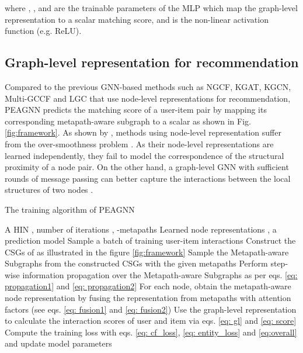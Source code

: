 \documentclass[runningheads, envcountsame, a4paper]{llncs}
\begin{document}
where , ,  and  are the trainable parameters of the MLP which map the graph-level representation  to a scalar matching score, and  is the non-linear activation function (e.g. ReLU).


\subsection{Graph-level representation for recommendation}
Compared to the previous GNN-based methods such as NGCF, KGAT, KGCN, Multi-GCCF and LGC that use node-level representations for recommendation, PEAGNN predicts the matching score of a user-item pair by mapping its corresponding metapath-aware subgraph to a scalar as shown in Fig. \ref{fig:framework}. 
As shown by \cite{zhang2019inductive}, methods using node-level representation suffer from the over-smoothness problem \cite{li2018deeper}\cite{kipf2016semi}.
As their node-level representations are learned independently, 
they fail to model the correspondence of the structural proximity of a node pair. 
On the other hand, a graph-level GNN with sufficient rounds of message passing can better capture the interactions between the local structures of two nodes \cite{xu2018powerful}.

\begin{algorithm}[tb]
   \caption{The training algorithm of PEAGNN}
   \label{alg:peagat}
\begin{algorithmic}[1]
    A HIN , 
number of iterations , -metapaths
    Learned node representations , a prediction  model 
        \STATE Sample a batch  of training user-item interactions
        \STATE Construct the CSGs of  as illustrated in the figure \ref{fig:framework}
        \STATE Sample the Metapath-aware Subgraphs
        from the constructed CSGs with the given  metapaths
        \STATE Perform step-wise information propagation over the Metapath-aware Subgraphs as per eqs. \ref{eq: propagation1} and \ref{eq: propagation2}
        \STATE For each node, obtain the metapath-aware node representation by fusing the representation from  metapaths with attention factors (see eqs. \ref{eq: fusion1} and \ref{eq: fusion2})
        \STATE Use the graph-level representation to calculate the interaction scores of user  and item  via eqs. \ref{eq: gl} and \ref{eq: score}
        \STATE Compute the training loss with eqs. \ref{eq: cf_loss}, \ref{eq: entity_loss} and \ref{eq:overall} and update model parameters
\ENDFOR
\end{algorithmic}
\end{algorithm}
\end{document}
